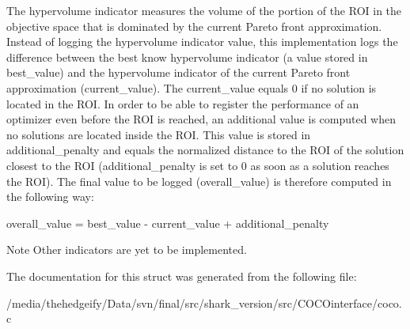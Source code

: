 The hypervolume indicator measures the volume of the portion of the R\+OI in the objective space that is dominated by the current Pareto front approximation. Instead of logging the hypervolume indicator value, this implementation logs the difference between the best know hypervolume indicator (a value stored in best\+\_\+value) and the hypervolume indicator of the current Pareto front approximation (current\+\_\+value). The current\+\_\+value equals 0 if no solution is located in the R\+OI. In order to be able to register the performance of an optimizer even before the R\+OI is reached, an additional value is computed when no solutions are located inside the R\+OI. This value is stored in additional\+\_\+penalty and equals the normalized distance to the R\+OI of the solution closest to the R\+OI (additional\+\_\+penalty is set to 0 as soon as a solution reaches the R\+OI). The final value to be logged (overall\+\_\+value) is therefore computed in the following way\+:

overall\+\_\+value = best\+\_\+value -\/ current\+\_\+value + additional\+\_\+penalty

\begin{DoxyNote}{Note}
Other indicators are yet to be implemented. 
\end{DoxyNote}


The documentation for this struct was generated from the following file\+:\begin{DoxyCompactItemize}
\item 
/media/thehedgeify/\+Data/svn/final/src/shark\+\_\+version/src/\+C\+O\+C\+Ointerface/coco.\+c\end{DoxyCompactItemize}
